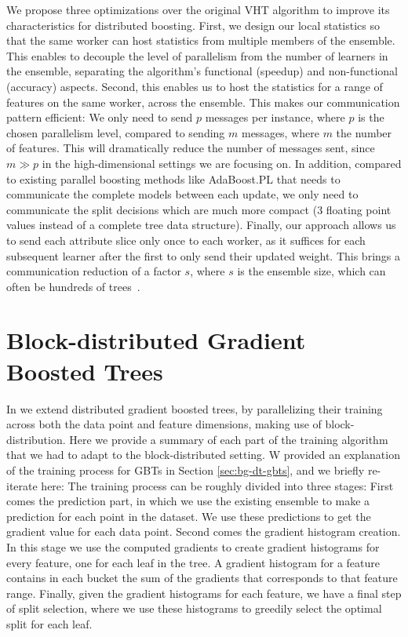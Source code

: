 We propose three optimizations over the original VHT algorithm to improve its
characteristics for distributed boosting. First, we design our local statistics
so that the same worker can host statistics from multiple members of the ensemble.
This enables to decouple the level of parallelism from the number of learners
in the ensemble, separating the algorithm's functional (speedup) and non-functional
(accuracy) aspects.
Second, this enables us to host the statistics for a range of features on the same
worker, across the ensemble. This makes our communication pattern efficient:
We only need to send $p$  messages per instance, where $p$ is the chosen
parallelism level, compared to sending $m$ messages, where $m$ the
number of features. This will dramatically
reduce the number of messages sent, since $m \gg p$ in the high-dimensional
settings we are focusing on. In addition, compared to existing
parallel boosting methods like AdaBoost.PL \cite{adaboost-pl} that needs to communicate the complete
models between each update, we only need to communicate the split decisions which are
much more compact (3 floating point values instead of a complete tree data structure).
Finally, our approach allows us to send each attribute slice only once to
each worker, as it suffices for each subsequent learner after the first
to only send their updated weight. This brings a communication reduction
of a factor $s$, where $s$ is the ensemble size, which can often be hundreds of
trees~\cite{hundreds-classifiers}.

\section{Block-distributed Gradient Boosted Trees}
\label{sec:block-gbt}

In \blockgbt we extend distributed gradient boosted trees, by parallelizing their
training across both the data point and feature dimensions, making use of block-distribution.
Here we provide a summary of each part of the training algorithm that we had to
adapt to the block-distributed setting. W provided an explanation of the training
process for GBTs in Section \ref{sec:bg-dt-gbts}, and we briefly re-iterate here:
The training process can be roughly divided into three stages: First comes
the prediction part, in which we use the existing ensemble to make a prediction
for each point in the dataset. We use these predictions to get the gradient
value for each data point. Second comes the gradient histogram creation.
In this stage we use the computed gradients to create gradient histograms
for every feature, one for each leaf in the tree. A gradient histogram
for a feature contains in each bucket the sum of the gradients that corresponds to
that feature range. Finally, given the gradient histograms for each feature,
we have a final step of split selection, where we use these histograms to greedily
select the optimal split for each leaf.

